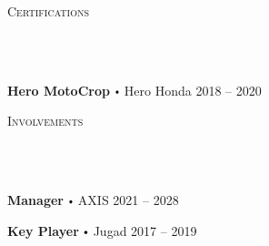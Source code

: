 \documentclass{article}
\newcommand{\lineunder}{
      \vspace*{-8pt} \\ \hspace*{-18pt} 
      \hrulefill \\
      }
\newcommand{\header}[1]{{
      \hspace*{-15pt}\vspace*{6pt} \textsc{#1}} \vspace*{-6pt} 
      \lineunder
      }
\renewcommand{\labelitemi}{
      $\vcenter{\hbox{\tiny$\bullet$}}$\hspace*{3pt}
      }
\renewcommand{\labelitemii}{
      $\vcenter{\hbox{\tiny$\bullet$}}$\hspace*{-3pt}
      }
\newenvironment{bullet-list-major}{
        \begin{list}{\labelitemii}{\setlength\leftmargin{3pt} 
        \topsep 0pt \itemsep -2pt}}{\vspace*{4pt}\end{list}
        }
\begin{document}
    \vspace*{4pt}%
    \header{Certifications}
    {
      \begin{bullet-list-major}
      \item \textbf{Hero MotoCrop} \labelitemi Hero Honda \hfill 2018 -- 2020
      \end{bullet-list-major}
      }
    \vspace*{4pt}%
    \header{Involvements}
    {

      \begin{bullet-list-major}
      \item \textbf{Manager} \labelitemi AXIS \hfill 2021 -- 2028
      
      \end{bullet-list-major}
      


      \begin{bullet-list-major}
      \item \textbf{Key Player} \labelitemi Jugad \hfill 2017 -- 2019
      
      \end{bullet-list-major}
      }
    
\end{document}
